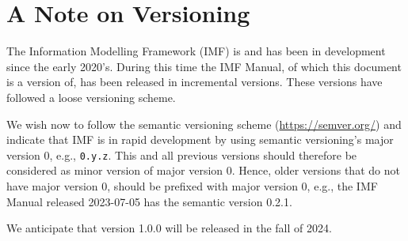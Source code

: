 \documentclass[../main.tex]{subfiles}
\begin{document}
\chapter{A Note on Versioning}

The Information Modelling Framework (IMF) is and has been in development since the early 2020's. During this time the IMF Manual, of which this document is a version of, has been released in incremental versions. These versions have followed a loose versioning scheme. 

We wish now to follow the semantic versioning scheme (\url{https://semver.org/}) and
indicate that IMF is in rapid development by using semantic versioning's major version 0, e.g., \texttt{0.y.z}. This and all previous versions should therefore be considered as minor version of major version 0. Hence, older versions that do not have major version 0, should be prefixed with major version 0, e.g., the IMF Manual released 2023-07-05 has the semantic version 0.2.1.

We anticipate that version 1.0.0 will be released in the fall of 2024.
\end{document}
